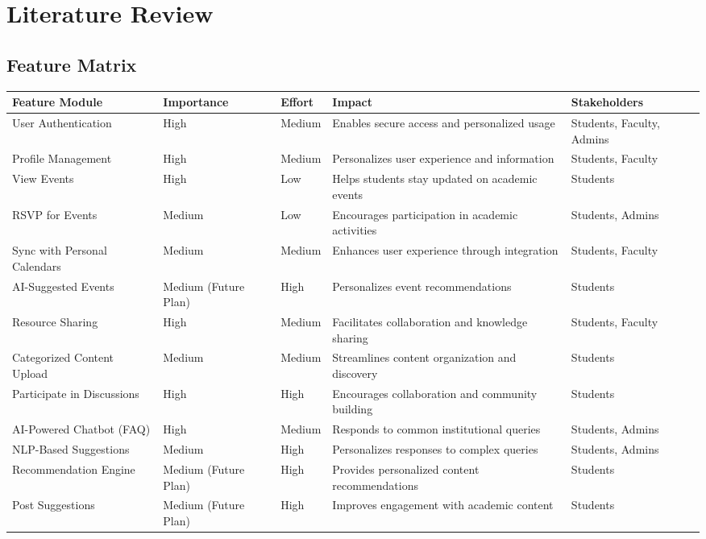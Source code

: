 \chapter{Literature Review}

\section{Feature Matrix}

\begin{longtable}{|L{2cm}|C{2.2cm}|C{2cm}|L{4cm}|L{2.5cm}|}
\hline
\textbf{Feature Module} & \textbf{Importance} & \textbf{Effort} & \textbf{Impact} & \textbf{Stakeholders} \\
\hline
User Authentication & High & Medium & Enables secure access and personalized usage & Students, Faculty, Admins \\
\hline
Profile Management & High & Medium & Personalizes user experience and information & Students, Faculty \\
\hline
View Events & High & Low & Helps students stay updated on academic events & Students \\
\hline
RSVP for Events & Medium & Low & Encourages participation in academic activities & Students, Admins \\
\hline
Sync with Personal Calendars & Medium & Medium & Enhances user experience through integration & Students, Faculty \\
\hline
AI-Suggested Events & Medium (Future Plan) & High & Personalizes event recommendations & Students \\
\hline
Resource Sharing & High & Medium & Facilitates collaboration and knowledge sharing & Students, Faculty \\
\hline
Categorized Content Upload & Medium & Medium & Streamlines content organization and discovery & Students \\
\hline
Participate in Discussions & High & High & Encourages collaboration and community building & Students \\
\hline
AI-Powered Chatbot (FAQ) & High & Medium & Responds to common institutional queries & Students, Admins \\
\hline
NLP-Based Suggestions & Medium & High & Personalizes responses to complex queries & Students, Admins \\
\hline
Recommendation Engine & Medium (Future Plan) & High & Provides personalized content recommendations & Students \\
\hline
Post Suggestions & Medium (Future Plan) & High & Improves engagement with academic content & Students \\

\end{longtable}
